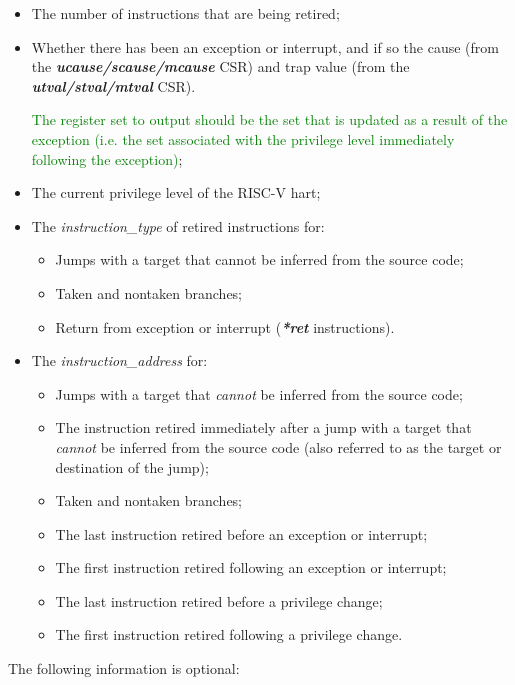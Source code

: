 \begin{itemize}
  \item The number of instructions that are being retired;
  \item Whether there has been an exception or interrupt, and if so the cause (from the \textbf{\textit{ucause/scause/mcause}} CSR)
        and trap value (from the \textbf{\textit{utval/stval/mtval}} CSR).

\textcolor{green}{The register set to output should be the set that is updated as a
result of the exception (i.e. the set associated with the privilege
level immediately following the exception)};

  \item The current privilege level of the RISC-V hart;
  \item The \textit{instruction\_type} of retired instructions for:
    \begin{itemize}
      \item Jumps with a target that cannot be inferred from the source code;
      \item Taken and nontaken branches;
      \item Return from exception or interrupt (\textbf{\textit{*ret}} instructions).
    \end{itemize}
  \item The \textit{instruction\_address} for:
    \begin{itemize}
      \item Jumps with a target that \textit{cannot} be inferred from the source code;
      \item The instruction retired immediately after a jump with a target that \textit{cannot} be inferred 
        from the source code (also referred to as the target or destination of the jump);
      \item Taken and nontaken branches;
      \item The last instruction retired before an exception or interrupt;
      \item The first instruction retired following an exception or interrupt;
      \item The last instruction retired before a privilege change;
      \item The first instruction retired following a privilege change.
    \end{itemize}
\end{itemize}

The following information is optional:

